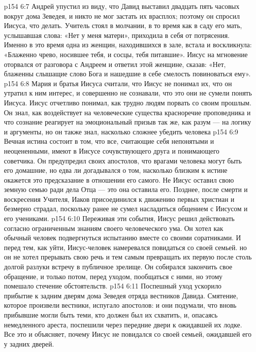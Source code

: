 \vs p154 6:7 Андрей упустил из виду, что Давид выставил двадцать пять часовых вокруг дома Зеведея, и никто не мог застать их врасплох; поэтому он спросил Иисуса, что делать. Учитель стоял в молчании, в то время как в саду его мать, услышавшая слова: «Нет у меня матери», приходила в себя от потрясения. Именно в это время одна из женщин, находившихся в зале, встала и воскликнула: «Блаженно чрево, носившее тебя, и сосцы, тебя питавшие». Иисус на мгновение оторвался от разговора с Андреем и ответил этой женщине, сказав: «Нет, блаженны слышащие слово Бога и нашедшие в себе смелость повиноваться ему».
\vs p154 6:8 \pc Мария и братья Иисуса считали, что Иисус не понимал их, что он утратил к ним интерес, и совершенно не сознавали, что это они не сумели понять Иисуса. Иисус отчетливо понимал, как трудно людям порвать со своим прошлым. Он знал, как воздействует на человеческие существа красноречие проповедника и что сознание реагирует на эмоциональный призыв так же, как разум --- на логику и аргументы, но он также знал, насколько сложнее убедить человека 
\vs p154 6:9 Вечная истина состоит в том, что все, считающие себя непонятыми и неоцененными, имеют в Иисусе сочувствующего друга и понимающего советчика. Он предупредил своих апостолов, что врагами человека могут быть его домашние, но едва ли догадывался о том, насколько близким к истине окажется это предсказание в отношении его самого. Не Иисус оставил свою земную семью ради дела Отца --- это она оставила его. Позднее, после смерти и воскресения Учителя, Иаков присоединился к движению первых христиан и безмерно страдал, поскольку ранее не сумел насладиться общением с Иисусом и его учениками.
\vs p154 6:10 \pc Переживая эти события, Иисус решил действовать согласно ограниченным знаниям своего человеческого ума. Он хотел как обычный человек подвергнуться испытанию вместе со своими соратниками. И перед тем, как уйти, Иисус\hyp{}человек намеревался повидаться со своей семьей. но он не хотел прерывать свою речь и тем самым превращать их первую после столь долгой разлуки встречу в публичное зрелище. Он собирался закончить свое обращение, и только потом, перед уходом, пообщаться с ними, но этому помешало стечение обстоятельств.
\vs p154 6:11 Поспешный уход ускорило прибытие к задним дверям дома Зеведея отряда вестников Давида. Смятение, которое произвели вестники, испугало апостолов: и они подумали, что вновь прибывшие могли быть теми, кто должен был их схватить, и, опасаясь немедленного ареста, поспешили через передние двери к ожидавшей их лодке. Все это и объясняет, почему Иисус не повидался со своей семьей, ожидавшей его у задних дверей.
